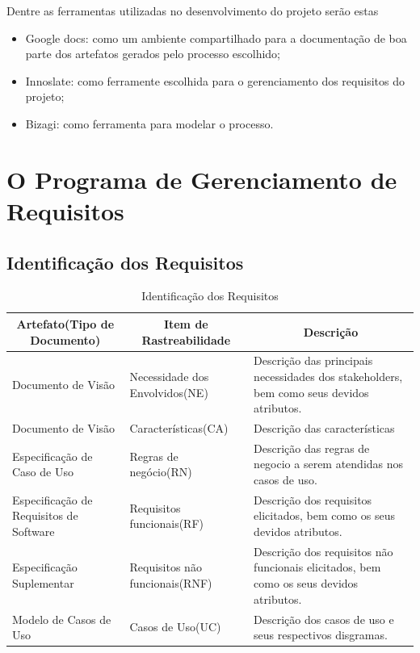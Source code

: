 Dentre as ferramentas utilizadas no desenvolvimento do projeto serão estas
\begin{itemize}

\item{Google docs: como um ambiente compartilhado para a documentação de boa parte dos artefatos gerados pelo processo escolhido;}

\item{Innoslate: como ferramente escolhida para o gerenciamento dos requisitos do projeto;}

\item{Bizagi: como ferramenta para modelar o processo.}

\end{itemize}


\section{O Programa de Gerenciamento de Requisitos}

\subsection{Identificação dos Requisitos}

\begin{table}[!h]
  \centering
  \caption{Identificação dos Requisitos}
  \label{identificação_dos_requisitos}
  \begin{tabular}{|p{4cm}|p{5cm}|p{6cm}|}
    \hline
    \multicolumn{1}{|c|}{\textbf{Artefato(Tipo de Documento)}} & \multicolumn{1}{c|}{\textbf{Item de Rastreabilidade}} & \multicolumn{1}{c|}{\textbf{Descrição}} \\ \hline
    Documento de Visão                      & Necessidade dos Envolvidos(NE)   & Descrição das principais necessidades dos stakeholders, bem como seus devidos atributos. \\ \hline
    Documento de Visão                      & Características(CA)              & Descrição das características                                                            \\ \hline
    Especificação de Caso de Uso            & Regras de negócio(RN)            & Descrição das regras de negocio a serem atendidas nos casos de uso.                      \\ \hline
    Especificação de Requisitos de Software & Requisitos funcionais(RF)        & Descrição dos requisitos elicitados, bem como os seus devidos atributos.                 \\ \hline
    Especificação Suplementar               & Requisitos não funcionais(RNF)   & Descrição dos requisitos não funcionais elicitados, bem como os seus devidos atributos.  \\ \hline
    Modelo de Casos de Uso                  & Casos de Uso(UC)                 & Descrição dos casos de uso e seus respectivos disgramas.                                 \\ \hline
  \end{tabular}
\end{table}

